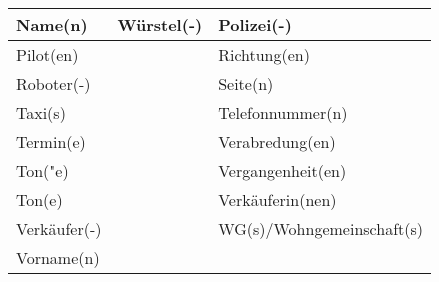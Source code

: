 \documentclass{article}
\begin{document}
\begin{table}[h!]
\begin{tabular}{|>{\raggedright\arraybackslash}p{5cm}|>{\raggedright\arraybackslash}p{5cm}|>{\raggedright\arraybackslash}p{5cm}|}
        Name(n) & Würstel(-) & Polizei(-) \\\hline
        Pilot(en) &  & Richtung(en) \\\hline
        Roboter(-) &  & Seite(n) \\\hline
        Taxi(s) &  & Telefonnummer(n) \\\hline
        Termin(e) &  & Verabredung(en) \\\hline
        Ton("e) &  & Vergangenheit(en) \\\hline
        Ton(e) &  & Verkäuferin(nen) \\\hline
        Verkäufer(-) &  & WG(s)/Wohngemeinschaft(s) \\\hline
        Vorname(n) &  &  \\\hline
    \end{tabular}
\end{table}
\end{document}
